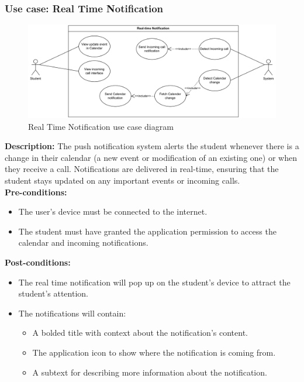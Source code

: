 \documentclass{article}
\begin{document}
\subsubsection{Use case: Real Time Notification}
    \begin{figure}[H]
        \centering
        \includegraphics[width=1\textwidth]{image/Real-timeNotificationUseCase.pdf} 
        \caption{Real Time Notification use case diagram}
        \label{fig:notification_usecase}
    \end{figure}
    \textbf{Description:} The push notification system alerts the student whenever there is a change in their calendar (a new event or modification of an existing one) or when they receive a call. Notifications are delivered in real-time, ensuring that the student stays updated on any important events or incoming calls. \\
    
    \noindent \textbf{Pre-conditions:} 
        \begin{itemize}
            \item The user’s device must be connected to the internet.
            \item The student must have granted the application permission to access the calendar and incoming notifications.
        \end{itemize}
    \noindent \textbf{Post-conditions:}
    \begin{itemize}
        \item The real time notification will pop up on the student's device to attract the student's attention.
        \item The notifications will contain:
        \begin{itemize}
            \item A bolded title with context about the notification’s content.
            \item The application icon to show where the notification is coming from.
            \item A subtext for describing more information about the notification.
        \end{itemize}
    \end{itemize}
\end{document}
